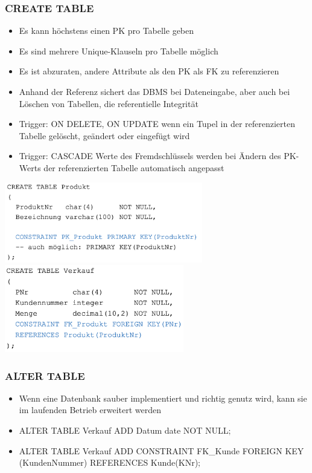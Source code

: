 \documentclass[8pt,a4paper]{scrartcl}
\begin{document}
\begin{multicols*}{3}
				\subsubsection{CREATE TABLE}
					\begin{itemize}\itemsep0pt		
						\item Es kann höchstens einen PK pro Tabelle geben
						\item Es sind mehrere Unique-Klauseln pro Tabelle möglich
						\item Es ist abzuraten, andere Attribute als den PK als FK zu referenzieren
						\item Anhand der Referenz sichert das DBMS bei Dateneingabe, aber auch bei Löschen von Tabellen, die referentielle Integrität
						\item Trigger: ON DELETE, ON UPDATE wenn ein Tupel in der referenzierten Tabelle gelöscht, geändert oder eingefügt wird
						\item Trigger: CASCADE Werte des Fremdschlüssels werden bei Ändern des PK-Werts der referenzierten Tabelle automatisch angepasst
						
					\end{itemize}		
					\includegraphics[height=3.5cm]{img/createTablePk.png}
					\includegraphics[height=3.8cm]{img/createTableFk.png}
				
				\subsubsection{ALTER TABLE}
					\begin{itemize}\itemsep0pt		
						\item Wenn eine Datenbank sauber implementiert und richtig genutz wird, kann sie im laufenden Betrieb erweitert werden
						\item ALTER TABLE Verkauf ADD Datum date NOT NULL$;$
						\item ALTER TABLE Verkauf ADD CONSTRAINT FK\_Kunde FOREIGN KEY (KundenNummer) REFERENCES Kunde(KNr)$;$
					\end{itemize}		
					

\end{multicols*}
\end{document}

